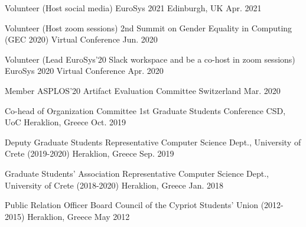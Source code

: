 
\begin{cvhonors}
  \cvhonor
    {Volunteer (Host social media)} %
    {EuroSys 2021} %
    {Edinburgh, UK} %
    {Apr. 2021} %

  \cvhonor
    {Volunteer (Host zoom sessions)} %
    {2nd Summit on Gender Equality in Computing (GEC 2020)} %
    {Virtual Conference} %
    {Jun. 2020} %


  \cvhonor
    {Volunteer (Lead EuroSys'20 Slack workspace and be a co-host in
    zoom sessions)} %
    {EuroSys 2020} %
    {Virtual Conference} %
    {Apr. 2020} %


  \cvhonor
    {Member} %
    {ASPLOS'20 Artifact Evaluation Committee} %
    {Switzerland} %
    {Mar. 2020} %

  \cvhonor
    {Co-head of Organization Committee} %
    {1st Graduate Students Conference CSD, UoC} %
    {Heraklion, Greece} %
    {Oct. 2019} %

  \cvhonor
    {Deputy Graduate Students Representative} %
    {Computer Science Dept., University of Crete (2019-2020)} %
    {Heraklion, Greece} %
    {Sep. 2019} %

  \cvhonor
    {Graduate Students' Association Representative} %
    {Computer Science Dept., University of Crete (2018-2020)} %
    {Heraklion, Greece} %
    {Jan. 2018} %

  \cvhonor
    {Public Relation Officer} %
    {Board Council of the Cypriot Students' Union (2012-2015)} %
    {Heraklion, Greece} %
    {May 2012} %

\end{cvhonors}
